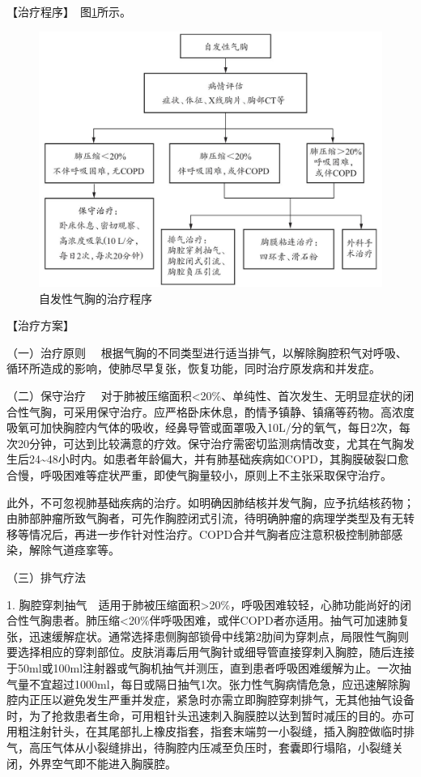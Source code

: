 【治疗程序】　图\ref{fig1-15-2}所示。

\begin{figure}[!htbp]
 \centering
 \includegraphics{./images/Image00038.jpg}
 \captionsetup{justification=centering}
 \caption{自发性气胸的治疗程序}
 \label{fig1-15-2}
  \end{figure} 

【治疗方案】

{（一）治疗原则}
　根据气胸的不同类型进行适当排气，以解除胸腔积气对呼吸、循环所造成的影响，使肺尽早复张，恢复功能，同时治疗原发病和并发症。

{（二）保守治疗}
　对于肺被压缩面积\textless{}20\%、单纯性、首次发生、无明显症状的闭合性气胸，可采用保守治疗。应严格卧床休息，酌情予镇静、镇痛等药物。高浓度吸氧可加快胸腔内气体的吸收，经鼻导管或面罩吸入10L/分的氧气，每日2次，每次20分钟，可达到比较满意的疗效。保守治疗需密切监测病情改变，尤其在气胸发生后24\textasciitilde{}48小时内。如患者年龄偏大，并有肺基础疾病如COPD，其胸膜破裂口愈合慢，呼吸困难等症状严重，即使气胸量较小，原则上不主张采取保守治疗。

此外，不可忽视肺基础疾病的治疗。如明确因肺结核并发气胸，应予抗结核药物；由肺部肿瘤所致气胸者，可先作胸腔闭式引流，待明确肿瘤的病理学类型及有无转移等情况后，再进一步作针对性治疗。COPD合并气胸者应注意积极控制肺部感染，解除气道痉挛等。

{（三）排气疗法}

1.
胸腔穿刺抽气　适用于肺被压缩面积\textgreater{}20\%，呼吸困难较轻，心肺功能尚好的闭合性气胸患者。肺压缩\textless{}20\%伴呼吸困难，或伴COPD者亦适用。抽气可加速肺复张，迅速缓解症状。通常选择患侧胸部锁骨中线第2肋间为穿刺点，局限性气胸则要选择相应的穿刺部位。皮肤消毒后用气胸针或细导管直接穿刺入胸腔，随后连接于50ml或100ml注射器或气胸机抽气并测压，直到患者呼吸困难缓解为止。一次抽气量不宜超过1000ml，每日或隔日抽气1次。张力性气胸病情危急，应迅速解除胸腔内正压以避免发生严重并发症，紧急时亦需立即胸腔穿刺排气，无其他抽气设备时，为了抢救患者生命，可用粗针头迅速刺入胸膜腔以达到暂时减压的目的。亦可用粗注射针头，在其尾部扎上橡皮指套，指套末端剪一小裂缝，插入胸腔做临时排气，高压气体从小裂缝排出，待胸腔内压减至负压时，套囊即行塌陷，小裂缝关闭，外界空气即不能进入胸膜腔。


